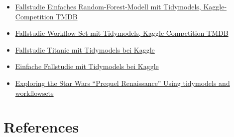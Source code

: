 \documentclass[
  letterpaper,
  DIV=11,
  numbers=noendperiod]{scrreprt}
\theoremstyle{definition}
\theoremstyle{definition}
\theoremstyle{remark}
\begin{document}
\begin{itemize}
{  Einfache lineare Regression mit Tidymodels, Kaggle-Competition TMDB}
\item
  \href{https://www.kaggle.com/code/ssauer/simple-rf-tuned}{Fallstudie
  Einfaches Random-Forest-Modell mit Tidymodels, Kaggle-Competition
  TMDB}
\item
  \href{https://www.kaggle.com/ssauer/tmdb-xgboost-tidymodels}{Fallstudie
  Workflow-Set mit Tidymodels, Kaggle-Competition TMDB}
\item
  \href{https://www.kaggle.com/code/modesty520/a-tutorial-with-tidymodels/report\#modeling}{Fallstudie
  Titanic mit Tidymodels bei Kaggle}
\item
  \href{https://www.kaggle.com/code/benthecoder/tidymodels-in-r-using-measles-data/notebook}{Einfache
  Fallstudie mit Tidymodels bei Kaggle}
\item
  \href{https://www.r-bloggers.com/2021/04/exploring-the-star-wars-prequel-renaissance-using-tidymodels-and-workflowsets/}{Exploring
  the Star Wars ``Prequel Renaissance'' Using tidymodels and
  workflowsets}
\end{itemize}


\hypertarget{references}{%
\chapter*{References}\label{references}}
\end{document}
